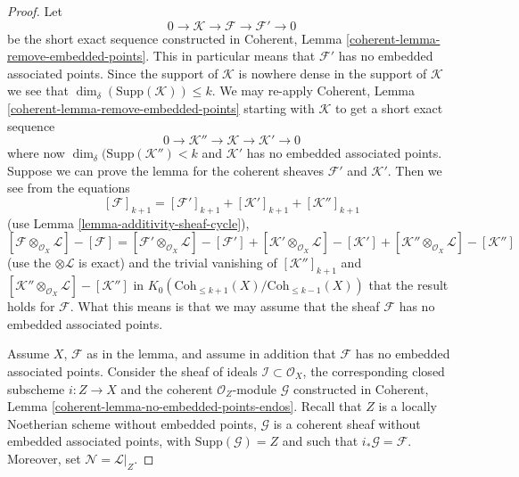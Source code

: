 \begin{proof}
Let
$$
0 \to \mathcal{K} \to \mathcal{F} \to \mathcal{F}' \to 0
$$
be the short exact sequence constructed in
Coherent, Lemma \ref{coherent-lemma-remove-embedded-points}.
This in particular means that $\mathcal{F}'$ has no embedded
associated points.
Since the support of $\mathcal{K}$ is nowhere dense in the
support of $\mathcal{K}$ we see that
$\dim_\delta(\text{Supp}(\mathcal{K})) \leq k$. We may
re-apply
Coherent, Lemma \ref{coherent-lemma-remove-embedded-points}
starting with $\mathcal{K}$ to get a short exact sequence
$$
0 \to \mathcal{K}'' \to \mathcal{K} \to \mathcal{K}' \to 0
$$
where now $\dim_\delta(\text{Supp}(\mathcal{K}'') < k$
and $\mathcal{K}'$ has no embedded associated points.
Suppose we can prove the lemma for the coherent sheaves
$\mathcal{F}'$ and $\mathcal{K}'$. Then we see
from the equations
$$
[\mathcal{F}]_{k + 1}
=
[\mathcal{F}']_{k + 1}
+ [\mathcal{K}']_{k + 1}
+ [\mathcal{K}'']_{k + 1}
$$
(use Lemma \ref{lemma-additivity-sheaf-cycle}),
$$
[\mathcal{F} \otimes_{\mathcal{O}_X} \mathcal{L}]
-
[\mathcal{F}]
=
[\mathcal{F}' \otimes_{\mathcal{O}_X} \mathcal{L}]
-
[\mathcal{F}']
+
[\mathcal{K}' \otimes_{\mathcal{O}_X} \mathcal{L}]
-
[\mathcal{K}']
+
[\mathcal{K}'' \otimes_{\mathcal{O}_X} \mathcal{L}]
-
[\mathcal{K}'']
$$
(use the $\otimes \mathcal{L}$ is exact)
and the trivial vanishing of $[\mathcal{K}'']_{k + 1}$ and
$[\mathcal{K}'' \otimes_{\mathcal{O}_X} \mathcal{L}]
- [\mathcal{K}'']$ in
$K_0(\text{Coh}_{\leq k + 1}(X)/\text{Coh}_{\leq k - 1}(X))$
that the result holds
for $\mathcal{F}$. What this means is that we may assume that
the sheaf $\mathcal{F}$ has no embedded associated points.

\medskip\noindent
Assume $X$, $\mathcal{F}$ as in the lemma, and assume in addition
that $\mathcal{F}$ has no embedded associated points. Consider the
sheaf of ideals $\mathcal{I} \subset \mathcal{O}_X$, the corresponding
closed subscheme $i : Z \to X$ and the coherent $\mathcal{O}_Z$-module
$\mathcal{G}$ constructed in
Coherent, Lemma \ref{coherent-lemma-no-embedded-points-endos}.
Recall that $Z$ is a locally Noetherian scheme without embedded points,
$\mathcal{G}$ is a coherent sheaf without embedded
associated points, with $\text{Supp}(\mathcal{G}) = Z$
and such that $i_*\mathcal{G} = \mathcal{F}$.
Moreover, set $\mathcal{N} = \mathcal{L}|_Z$.


\end{proof}

